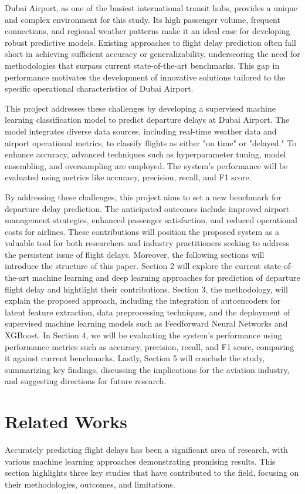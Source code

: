 \documentclass[twoside,11pt]{article}
\begin{document}
Dubai Airport, as one of the busiest international transit hubs, provides a unique and complex environment for this study. Its high passenger volume, frequent connections, and regional weather patterns make it an ideal case for developing robust predictive models. Existing approaches to flight delay prediction often fall short in achieving sufficient accuracy or generalizability, underscoring the need for methodologies that surpass current state-of-the-art benchmarks. This gap in performance motivates the development of innovative solutions tailored to the specific operational characteristics of Dubai Airport. 

This project addresses these challenges by developing a supervised machine learning classification model to predict departure delays at Dubai Airport. The model integrates diverse data sources, including real-time weather data and airport operational metrics, to classify flights as either "on time" or "delayed." To enhance accuracy, advanced techniques such as hyperparameter tuning, model ensembling, and oversampling are employed. The system’s performance will be evaluated using metrics like accuracy, precision, recall, and F1 score. 

By addressing these challenges, this project aims to set a new benchmark for departure delay prediction. The anticipated outcomes include improved airport management strategies, enhanced passenger satisfaction, and reduced operational costs for airlines. These contributions will position the proposed system as a valuable tool for both researchers and industry practitioners seeking to address the persistent issue of flight delays. Moreover, the following sections will introduce the structure of this paper. Section 2 will explore the current state-of-the-art machine learning and deep learning approaches for prediction of departure flight delay and hightlight their contributions. Section 3, the methodology, will explain the proposed approach, including the integration of autoencoders for latent feature extraction, data preprocessing techniques, and the deployment of supervised machine learning models such as Feedforward Neural Networks and XGBoost. In Section 4, we will be evaluating the system’s performance using performance metrics such as accuracy, precision, recall, and F1 score, comparing it against current benchmarks. Lastly, Section 5 will conclude the study, summarizing key findings, discussing the implications for the aviation industry, and suggesting directions for future research.

\section{Related Works}
Accurately predicting flight delays has been a significant area of research, with various machine learning approaches demonstrating promising results. This section highlights three key studies that have contributed to the field, focusing on their methodologies, outcomes, and limitations.  
\end{document}
